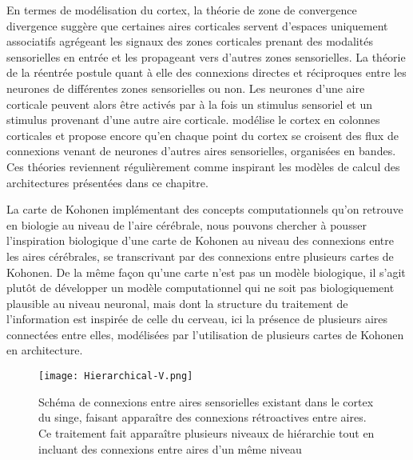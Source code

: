 \documentclass[../main]{subfiles}
\begin{document}
En termes de modélisation du cortex, la théorie de zone de convergence divergence \cite{damasio_time-locked_1989} suggère que certaines aires corticales servent d'espaces uniquement associatifs agrégeant les signaux des zones corticales prenant des modalités sensorielles en entrée et les propageant vers d'autres zones sensorielles. 
La théorie de la réentrée \cite{Edelman1982GroupSA} postule quant à elle des connexions directes et réciproques entre les neurones de différentes zones sensorielles ou non. Les neurones d'une aire corticale peuvent alors être activés par à la fois un stimulus sensoriel et un stimulus provenant d'une autre aire corticale.
\cite{Burnod1989AnAN} modélise le cortex en colonnes corticales et propose encore qu'en chaque point du cortex se croisent des flux de connexions venant de neurones d'autres aires sensorielles, organisées en bandes. Ces théories reviennent régulièrement comme inspirant les modèles de calcul des architectures présentées dans ce chapitre.

La carte de Kohonen implémentant des concepts computationnels qu'on retrouve en biologie au niveau de l'aire cérébrale, nous pouvons chercher à pousser l'inspiration biologique d'une carte de Kohonen au niveau des connexions entre les aires cérébrales, se transcrivant par des connexions entre plusieurs cartes de Kohonen.
De la même façon qu'une carte n'est pas un modèle biologique, il s'agit plutôt de développer un modèle computationnel qui ne soit pas biologiquement plausible au niveau neuronal, mais dont la structure du traitement de l'information est inspirée de celle du cerveau, ici la présence de plusieurs aires connectées entre elles, modélisées par l'utilisation de plusieurs cartes de Kohonen en architecture.


\begin{figure}
    \centering
    \texttt{[image: Hierarchical-V.png]}
    \caption{Schéma de connexions entre aires sensorielles existant dans le cortex du singe, faisant apparaître des connexions rétroactives entre aires. Ce traitement fait apparaître plusieurs niveaux de hiérarchie tout en incluant des connexions entre aires d'un même niveau \cite{primate_cortex_91}\label{fig:primate}}
\end{figure}
\end{document}
